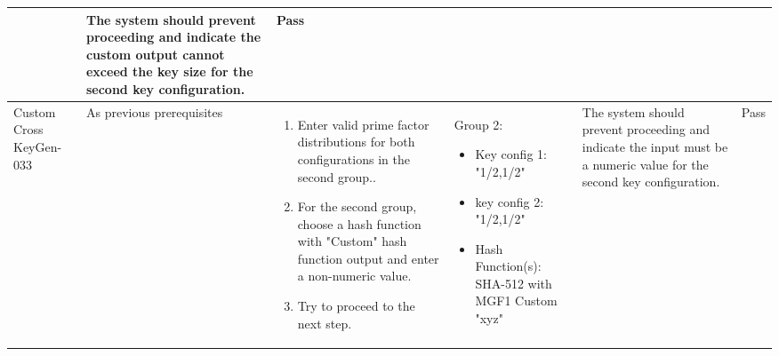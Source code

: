 \documentclass[]{final_report}
\theoremstyle{definition}
\begin{document}
\begin{longtable}{|p{1.5cm}|p{2.5cm}|p{3.5cm}|p{2.5cm}|p{3cm}|p{2cm}|}
 & The system should prevent proceeding and indicate the custom output cannot exceed the key size for the second key configuration. & Pass \\
  \hline
  Custom
  Cross
  KeyGen-033 & As previous prerequisites &
  \begin{enumerate}
    \item Enter valid prime factor distributions for both configurations in the second group..
    \item For the second group, choose a hash function with "Custom" hash function output and enter a non-numeric value.
    \item Try to proceed to the next step.
  \end{enumerate} & 
  Group 2: 
    \begin{itemize}
 \item Key config 1: "1/2,1/2"
 \item key config 2:  "1/2,1/2"
 \item Hash Function(s): SHA-512 with MGF1 Custom "xyz" 
    \end{itemize}
     & The system should prevent proceeding and indicate the input must be a numeric value for the second key configuration. & Pass \\
  \hline

\end{longtable}
\end{document}

